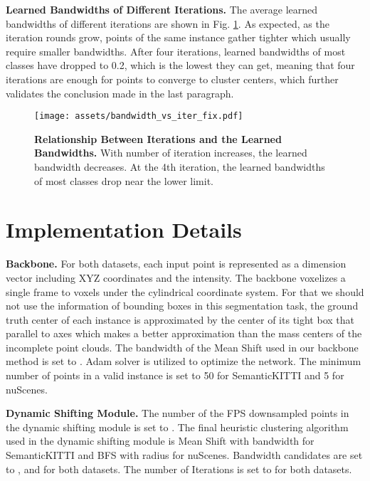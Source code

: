 \documentclass[final]{cvpr}
\begin{document}
 
\noindent\textbf{Learned Bandwidths of Different Iterations.}
The average learned bandwidths of different iterations are shown in Fig. \ref{fig:04_04_iteration_bandwidth}.
As expected, as the iteration rounds grow, points of the same instance gather tighter which usually require
smaller bandwidths.
After four iterations, learned bandwidths of most classes have dropped to 0.2, which is the lowest they
can get, meaning that four iterations are enough for \things{} points to converge to cluster centers, which
further validates the conclusion made in the last paragraph.
\begin{figure}[ht]
    \begin{center}
\texttt{[image: assets/bandwidth\_vs\_iter\_fix.pdf]}
    \end{center}
    \vspace{-0.8cm}
    \caption{\textbf{Relationship Between Iterations and the Learned Bandwidths.} With number of iteration increases, the learned bandwidth decreases. At the 4th iteration, the learned bandwidths of most classes drop near the lower limit.}
    \label{fig:04_04_iteration_bandwidth}
    \vspace{-0.3cm}
\end{figure} 
\section{Implementation Details} \label{sec:4}
\noindent\textbf{Backbone.}
For both datasets, each input point is represented as a  dimension vector including XYZ coordinates and the intensity.
The backbone voxelizes a single frame to  voxels under the cylindrical coordinate
system.
For that we should not use the information of bounding boxes in this segmentation task, the ground truth
center of each instance is approximated by the center of its tight box that parallel to axes which makes a better
approximation than the mass centers of the incomplete point clouds.
The bandwidth of the Mean Shift used in our backbone method is set to .
Adam solver is utilized to optimize the network.
The minimum number of points in a valid instance is set to 50 for SemanticKITTI and 5 for nuScenes.

\noindent\textbf{Dynamic Shifting Module.}
The number of the FPS downsampled points in the dynamic shifting module is set to .
The final heuristic clustering algorithm used in the dynamic shifting module is Mean Shift with  bandwidth for
SemanticKITTI and BFS with  radius for nuScenes.
Bandwidth candidates are set to ,  and  for both datasets.
The number of Iterations is set to  for both datasets.
\end{document}
